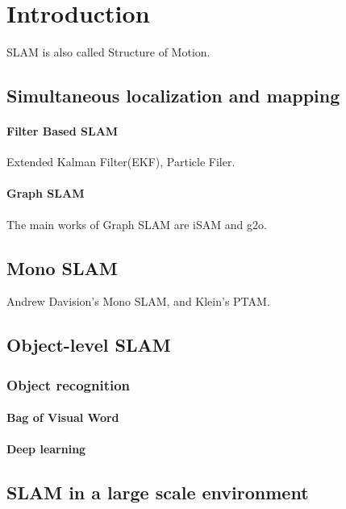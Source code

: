 \chapter{Introduction}
\label{cha:intro}
SLAM is also called Structure of Motion.

\section{Simultaneous localization and mapping}
\subsubsection{Filter Based SLAM}
Extended Kalman Filter(EKF), Particle Filer.
 
\subsubsection{Graph SLAM}
The main works of Graph SLAM are iSAM and g2o.

\section{Mono SLAM}
Andrew Davision\rq{}s Mono SLAM, and  Klein\rq{}s PTAM.



\section{Object-level SLAM}
\subsection{Object recognition}

\subsubsection{Bag of Visual Word}
\subsubsection{Deep learning}



\section{SLAM in a large scale environment}


